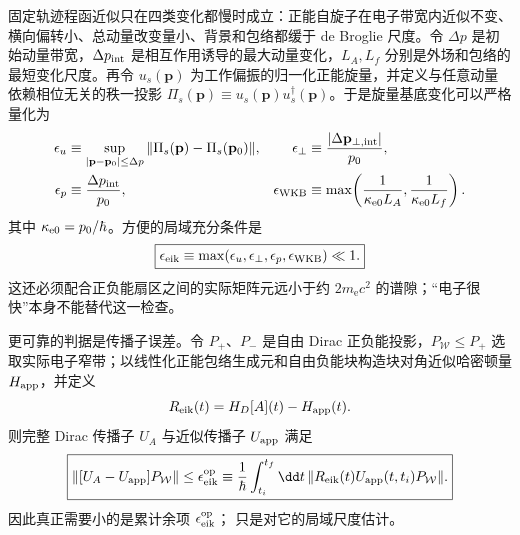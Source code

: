 固定轨迹程函近似只在四类变化都慢时成立：正能自旋子在电子带宽内近似不变、横向偏转小、总动量改变量小、背景和包络都缓于 de Broglie 尺度。令 $\Delta p$ 是初始动量带宽，$\Delta p_{\rm int}$ 是相互作用诱导的最大动量变化，$L_A,L_f$ 分别是外场和包络的最短变化尺度。再令 $u_s(\mathbf p)$ 为工作偏振的归一化正能旋量，并定义与任意动量依赖相位无关的秩一投影 $\Pi_s(\mathbf p)\equiv u_s(\mathbf p)u_s^\dagger(\mathbf p)$。于是旋量基底变化可以严格量化为
\begin{align*}
\epsilon_u&\equiv
\sup_{|\mathbf p-\mathbf p_0|\le\Delta p}
\|\Pi_s(\mathbf p)-\Pi_s(\mathbf p_0)\|,
&\epsilon_\perp&\equiv\frac{|\Delta\mathbf p_{\perp,{\rm int}}|}{p_0},\\
\epsilon_p&\equiv\frac{\Delta p_{\rm int}}{p_0},
&\epsilon_{\rm WKB}&\equiv\max\!\left(\frac1{\kappa_{\rm e0}L_A},\frac1{\kappa_{\rm e0}L_f}\right).
\end{align*}
其中 $\kappa_{\rm e0}=p_0/\hbar$。方便的局域充分条件是
\begin{equation}
\boxed{
\epsilon_{\rm eik}
\equiv\max(\epsilon_u,\epsilon_\perp,\epsilon_p,\epsilon_{\rm WKB})\ll1.}
\label{eq:general_eikonal_control_parameter}
\end{equation}
这还必须配合正负能扇区之间的实际矩阵元远小于约 $2m_{\mathrm e} c^2$ 的谱隙；“电子很快”本身不能替代这一检查。

更可靠的判据是传播子误差。令 $P_+$、$P_-$ 是自由 Dirac 正负能投影，$P_{\mathcal W}\le P_+$ 选取实际电子窄带；以线性化正能包络生成元和自由负能块构造块对角近似哈密顿量$H_{\rm app}$，并定义
\begin{equation*}
R_{\rm eik}(t)=H_D[A](t)-H_{\rm app}(t).
\end{equation*}
则完整 Dirac 传播子 $U_A$ 与近似传播子 $U_{\rm app}$ 满足
\begin{equation}
\boxed{
\|[U_A-U_{\rm app}]P_{\mathcal W}\|
\le
\epsilon_{\rm eik}^{\rm op}
\equiv\frac1\hbar\int_{t_i}^{t_f}\dd t\,
\|R_{\rm eik}(t)U_{\rm app}(t,t_i)P_{\mathcal W}\|.}
\label{eq:eikonal_duhamel_error_bound}
\end{equation}
因此真正需要小的是累计余项 $\epsilon_{\rm eik}^{\rm op}$； 只是对它的局域尺度估计。

